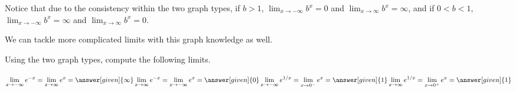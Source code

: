 \documentclass{ximera}
\begin{document}
Notice that due to the consistency within the two graph types, if $b>1$, $\displaystyle\lim_{x\rightarrow -\infty}b^x=0$ and $\displaystyle\lim_{x\rightarrow \infty}b^x=\infty$, and if $0<b<1$, $\displaystyle\lim_{x\rightarrow -\infty}b^x=\infty$ and $\displaystyle\lim_{x\rightarrow \infty}b^x=0$.

We can tackle more complicated limits with this graph knowledge as well.

\begin{question}
Using the two graph types, compute the following limits.

$\displaystyle\lim_{x\rightarrow -\infty}e^{-x}=\lim_{x\rightarrow \infty}e^{x}=\answer[given]{\infty}\\
\displaystyle\lim_{x\rightarrow \infty}e^{-x}=\lim_{x\rightarrow -\infty}e^{x}=\answer[given]{0}\\
\displaystyle\lim_{x\rightarrow -\infty}e^{1/x}=\lim_{x\rightarrow 0^-}e^{x}=\answer[given]{1}\\
\displaystyle\lim_{x\rightarrow \infty}e^{1/x}=\lim_{x\rightarrow 0^+}e^{x}=\answer[given]{1}$
\end{question}
\end{document}

